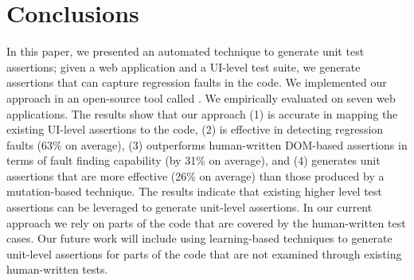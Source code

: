 \section{Conclusions} \label{Sec:concs}
In this paper, we presented an automated technique to generate \javascript unit test assertions; given  a web application and a UI-level test suite, we generate assertions that can capture regression faults in the \javascript code. We implemented our approach in an open-source tool called \tool. We empirically evaluated \tool on seven web applications. The results show that our approach (1) is accurate in mapping the existing UI-level assertions to the \javascript code, (2) is effective in detecting regression faults (63\% on average), (3) outperforms human-written DOM-based assertions in terms of fault finding capability (by 31\% on average), and (4) generates unit assertions that are more effective (26\% on average) than those produced by a mutation-based technique.
The results indicate that existing higher level test assertions can be leveraged to generate unit-level assertions. In our current approach we rely on parts of the code that are covered by the human-written test cases. Our future work will include using learning-based techniques to generate unit-level assertions for parts of the code that are not examined through existing human-written tests.     

